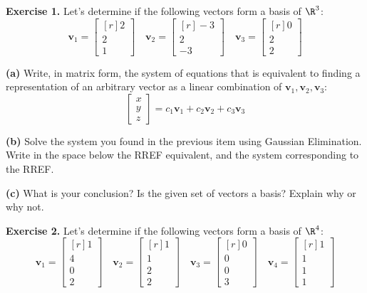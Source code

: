 \documentclass[12pt]{article}
\begin{document}
\textbf{Exercise 1.} Let's determine if the following vectors form a basis of $\R^3$:
\[
\mathbf{v}_1=\begin{bmatrix*}[r] 2  \\ 2 \\ 1 \end{bmatrix*}\quad
\mathbf{v}_2=\begin{bmatrix*}[r] -3  \\ 2 \\ -3 \end{bmatrix*}\quad
\mathbf{v}_3=\begin{bmatrix*}[r] 0 \\ 2 \\ 2 \end{bmatrix*}
\]

\textbf{(a)} Write, in matrix form, the system of equations that is equivalent to finding a representation of an arbitrary vector as a linear combination of $\mathbf{v}_1,\mathbf{v}_2,\mathbf{v}_3$:
\[
\begin{bmatrix} x \\ y \\ z\end{bmatrix} = c_1\mathbf{v}_1+c_2\mathbf{v}_2+c_3\mathbf{v}_3
\]

\vskip2in

\textbf{(b)} Solve the system you found in the previous item using Gaussian Elimination. Write in the space below the RREF equivalent, and the system corresponding to the RREF.

\vskip3in

\textbf{(c)} What is your conclusion? Is the given set of vectors a basis? Explain why or why not.

\clearpage

\textbf{Exercise 2.} Let's determine if the following vectors form a basis of $\R^4$:
\[
\mathbf{v}_1=\begin{bmatrix*}[r] 1  \\ 4 \\ 0 \\ 2 \end{bmatrix*}\quad
\mathbf{v}_2=\begin{bmatrix*}[r] 1  \\ 1 \\ 2  \\ 2\end{bmatrix*}\quad
\mathbf{v}_3=\begin{bmatrix*}[r] 0 \\ 0 \\ 0 \\ 3 \end{bmatrix*}\quad
\mathbf{v}_4=\begin{bmatrix*}[r] 1 \\ 1 \\ 1 \\ 1 \end{bmatrix*}
\]
\end{document}
